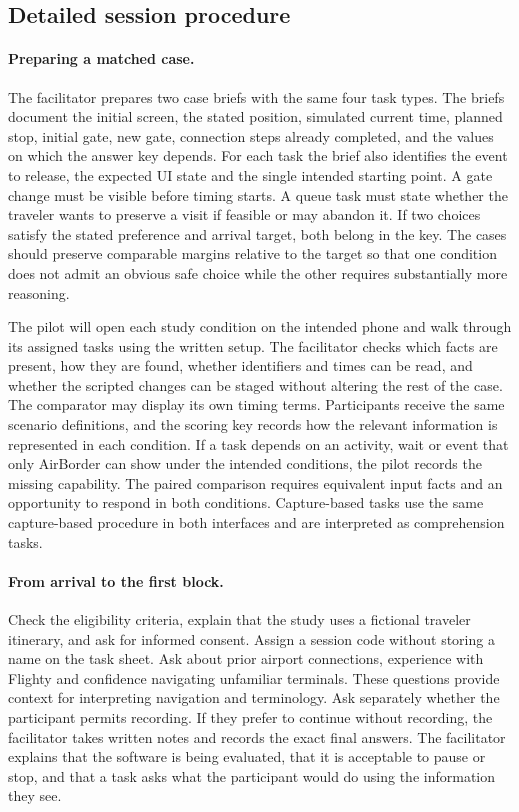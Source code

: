 \documentclass[sigconf,nonacm,balance=false]{acmart}
\begin{document}
\subsection{Detailed session procedure}
\paragraph{Preparing a matched case.} The facilitator prepares two case briefs with the same four task types. The briefs document the initial screen, the stated position, simulated current time, planned stop, initial gate, new gate, connection steps already completed, and the values on which the answer key depends. For each task the brief also identifies the event to release, the expected UI state and the single intended starting point. A gate change must be visible before timing starts. A queue task must state whether the traveler wants to preserve a visit if feasible or may abandon it. If two choices satisfy the stated preference and arrival target, both belong in the key. The cases should preserve comparable margins relative to the target so that one condition does not admit an obvious safe choice while the other requires substantially more reasoning.

The pilot will open each study condition on the intended phone and walk through its assigned tasks using the written setup. The facilitator checks which facts are present, how they are found, whether identifiers and times can be read, and whether the scripted changes can be staged without altering the rest of the case. The comparator may display its own timing terms. Participants receive the same scenario definitions, and the scoring key records how the relevant information is represented in each condition. If a task depends on an activity, wait or event that only AirBorder can show under the intended conditions, the pilot records the missing capability. The paired comparison requires equivalent input facts and an opportunity to respond in both conditions. Capture-based tasks use the same capture-based procedure in both interfaces and are interpreted as comprehension tasks.

\paragraph{From arrival to the first block.} Check the eligibility criteria, explain that the study uses a fictional traveler itinerary, and ask for informed consent. Assign a session code without storing a name on the task sheet. Ask about prior airport connections, experience with Flighty and confidence navigating unfamiliar terminals. These questions provide context for interpreting navigation and terminology. Ask separately whether the participant permits recording. If they prefer to continue without recording, the facilitator takes written notes and records the exact final answers. The facilitator explains that the software is being evaluated, that it is acceptable to pause or stop, and that a task asks what the participant would do using the information they see.
\end{document}
